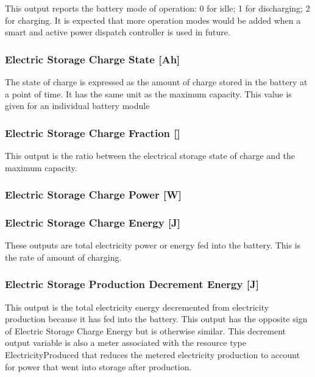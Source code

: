 This output reports the battery mode of operation: 0 for idle; 1 for discharging; 2 for charging. It is expected that more operation modes would be added when a smart and active power dispatch controller is used in future.

\subsubsection{Electric Storage Charge State {[}Ah{]}}\label{electric-storage-charge-state-ah}

The state of charge is expressed as the amount of charge stored in the battery at a point of time. It has the same unit as the maximum capacity. This value is given for an individual battery module

\subsubsection{\texorpdfstring{Electric Storage Charge Fraction {[]}}{Electric Storage Charge Fraction }}\label{electric-storage-charge-fraction}

This output is the ratio between the electrical storage state of charge and the maximum capacity.

\subsubsection{Electric Storage Charge Power {[}W{]}}\label{electric-storage-charge-power-w-1}

\subsubsection{Electric Storage Charge Energy {[}J{]}}\label{electric-storage-charge-energy-j-1}

These outputs are total electricity power or energy fed into the battery. This is the rate of amount of charging.

\subsubsection{Electric Storage Production Decrement Energy {[}J{]}}\label{electric-storage-production-decrement-energy-j-1}

This output is the total electricity energy decremented from electricity production because it has fed into the battery. This output has the opposite sign of Electric Storage Charge Energy but is otherwise similar. This decrement output variable is also a meter associated with the resource type ElectricityProduced that reduces the metered electricity production to account for power that went into storage after production.

